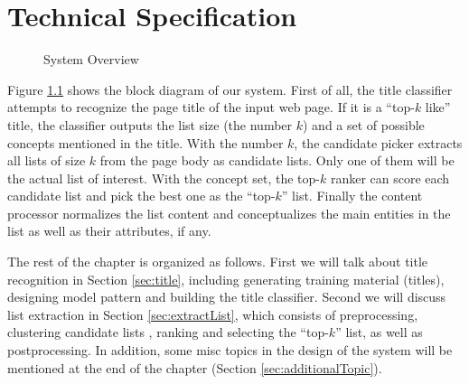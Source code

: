 \chapter{Technical Specification}
\label{sec:algo}

\begin{figure}[th]
\centering
{}
\caption{System Overview}
\label{fig:sys}
\end{figure}

Figure \ref{fig:sys} shows the block diagram of our system.
First of all, the title classifier attempts to recognize the page title of the input web page.
If it is a ``top-$k$ like'' title,
the classifier outputs the list size (the number $k$)
and a set of possible concepts mentioned in the title.
With the number $k$, the candidate picker extracts all lists of size $k$
from the page body as candidate lists. Only one of them will be the actual
list of interest. With the concept set,
the top-$k$ ranker can score each candidate list and pick the best one
as the ``top-$k$'' list.  Finally the content processor
normalizes the list content
and conceptualizes the main entities in the list
as well as their attributes, if any.

The rest of the chapter is organized as follows.
First we will talk about title recognition in Section \ref{sec:title},
including generating training material (titles), designing model pattern
and building the title classifier.
Second we will discuss list extraction in Section \ref{sec:extractList}, which consists of
preprocessing, clustering candidate lists , ranking and selecting the ``top-$k$'' list, as well as postprocessing.
In addition, some misc topics in the design of the system will be mentioned at the end of the chapter (Section \ref{sec:additionalTopic}).






